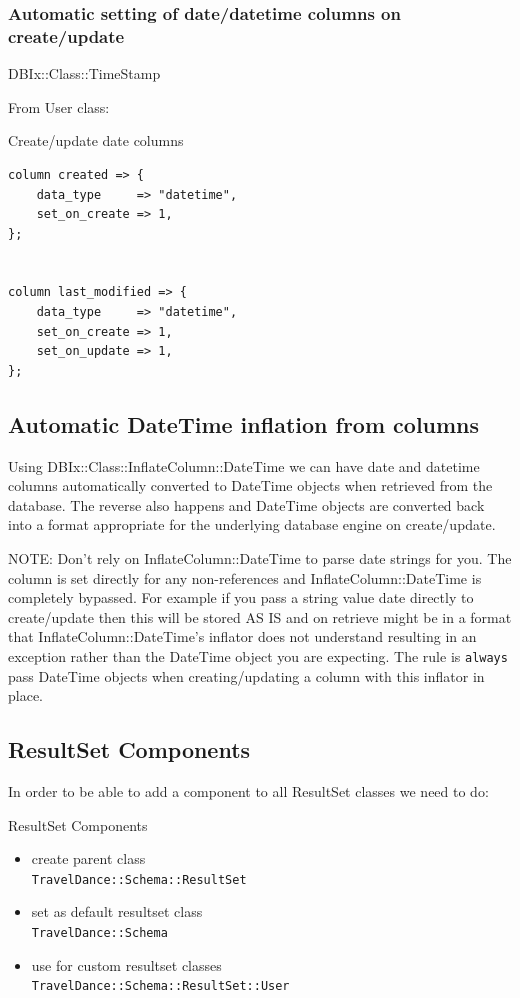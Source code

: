 \subsubsection{Automatic setting of date/datetime columns on create/update}
DBIx::Class::TimeStamp

From User class:

\begin{frame}[fragile]{Create/update date columns}
\begin{lstlisting}
column created => {
    data_type     => "datetime",
    set_on_create => 1,
};


column last_modified => {
    data_type     => "datetime",
    set_on_create => 1,
    set_on_update => 1,
};
\end{lstlisting}
\end{frame}

\subsection{Automatic DateTime inflation from columns}

Using DBIx::Class::InflateColumn::DateTime we can have date and datetime
columns automatically converted to DateTime objects when retrieved from the
database. The reverse also happens and DateTime objects are converted back
into a format appropriate for the underlying database engine on
create/update.

NOTE: Don't rely on InflateColumn::DateTime to parse date strings for
you. The column is set directly for any non-references and
InflateColumn::DateTime is completely bypassed. For example if you pass a
string value date directly to create/update then this will be stored AS IS
and on retrieve might be in a format that InflateColumn::DateTime’s inflator
does not understand resulting in an exception rather than the DateTime
object you are expecting. The rule is \verb|always| pass DateTime objects when
creating/updating a column with this inflator in place.

\subsection{ResultSet Components}

In order to be able to add a component to all ResultSet classes we need to
do:

\begin{frame}[fragile]{ResultSet Components}
\begin{itemize}
\item create parent class \\
  \verb|TravelDance::Schema::ResultSet|
\item set as default resultset class \\
  \verb|TravelDance::Schema|
\item use for custom resultset classes \\
 \verb|TravelDance::Schema::ResultSet::User|
\end{itemize}
\end{frame}

